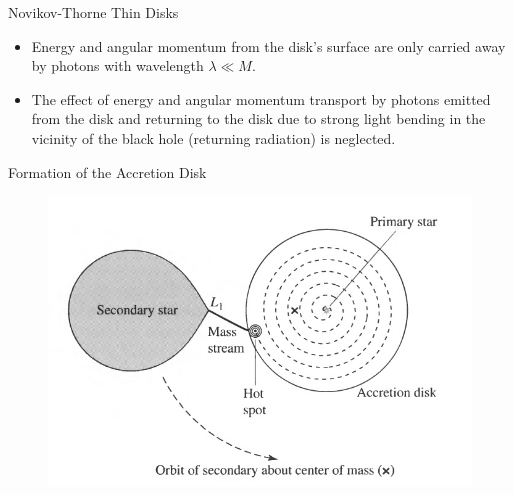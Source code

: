 \documentclass{beamer}
\begin{document}
\begin{darkframes}
\begin{frame}{Novikov-Thorne Thin Disks}
	\begin{itemize}
	\item Energy and angular momentum from the disk’s surface are only carried away by photons with wavelength $\lambda \ll M$.
	\pause
	\item The effect of energy and angular momentum transport by photons emitted from the disk and returning to the disk due to strong light bending in the vicinity of the black hole (returning radiation) is neglected.
	\end{itemize}		
\end{frame}


\end{darkframes}

\begin{frame}{Formation of the Accretion Disk}
	\begin{center}
      \begin{figure}
      	\includegraphics[scale=0.4] {figures/diskFormation.jpeg}
      \end{figure}
	\end{center}	
\end{frame}
\end{document}
